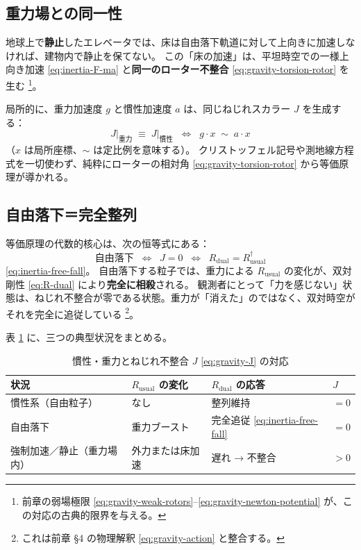 \documentclass[dvipdfmx,a4paper,oneside]{jsbook}
\numberwithin{equation}{chapter}
\begin{document}
\subsection{重力場との同一性}

地球上で\textbf{静止}したエレベータでは、床は自由落下軌道に対して上向きに加速しなければ、建物内で静止を保てない。
この「床の加速」は、平坦時空での一様上向き加速 \eqref{eq:inertia-F-ma} と\textbf{同一のローター不整合} \eqref{eq:gravity-torsion-rotor} を生む \footnote{前章の弱場極限 \eqref{eq:gravity-weak-rotors}–\eqref{eq:gravity-newton-potential} が、この対応の古典的限界を与える。}。

局所的に、重力加速度 \(g\) と慣性加速度 \(a\) は、同じねじれスカラー \(J\) を生成する：
\begin{equation}
  \boxed{\;
  J\big|_{\text{重力}} \;\equiv\; J\big|_{\text{慣性}}
  \;\;\Longleftrightarrow\;\;
  g \cdot x \;\sim\; a \cdot x
  \;}
  \label{eq:inertia-equivalence-J}
\end{equation}
（\(x\) は局所座標、\(\sim\) は定比例を意味する）。
クリストッフェル記号や測地線方程式を一切使わず、純粋にローターの相対角 \eqref{eq:gravity-torsion-rotor} から等価原理が導かれる。

\subsection{自由落下＝完全整列}

等価原理の代数的核心は、次の恒等式にある：
\begin{equation}
  \text{自由落下}
  \;\;\Longleftrightarrow\;\;
  J = 0
  \;\;\Longleftrightarrow\;\;
  R_{\mathrm{dual}} = R_{\mathrm{usual}}^\dagger
  \label{eq:inertia-equiv-freefall}
\end{equation}
\eqref{eq:inertia-free-fall}。
自由落下する粒子では、重力による \(R_{\mathrm{usual}}\) の変化が、双対剛性 \eqref{eq:R-dual} により\textbf{完全に相殺}される。
観測者にとって「力を感じない」状態は、ねじれ不整合が零である状態。重力が「消えた」のではなく、双対時空がそれを完全に追従している \footnote{これは前章 §4 の物理解釈 \eqref{eq:gravity-action} と整合する。}。

表 \ref{tab:inertia-scenarios} に、三つの典型状況をまとめる。

\begin{table}[htbp]
  \centering
  \caption{慣性・重力とねじれ不整合 \(J\) \eqref{eq:gravity-J} の対応}
  \label{tab:inertia-scenarios}
  \begin{tabular}{@{}llll@{}}
    \toprule
    状況 & \(R_{\mathrm{usual}}\) の変化 & \(R_{\mathrm{dual}}\) の応答 & \(J\) \\
    \midrule
    慣性系（自由粒子） & なし & 整列維持 & \(= 0\) \\
    自由落下 & 重力ブースト & 完全追従 \eqref{eq:inertia-free-fall} & \(= 0\) \\
    強制加速／静止（重力場内） & 外力または床加速 & 遅れ → 不整合 & \(> 0\) \\
    \bottomrule
  \end{tabular}
\end{table}
\end{document}
